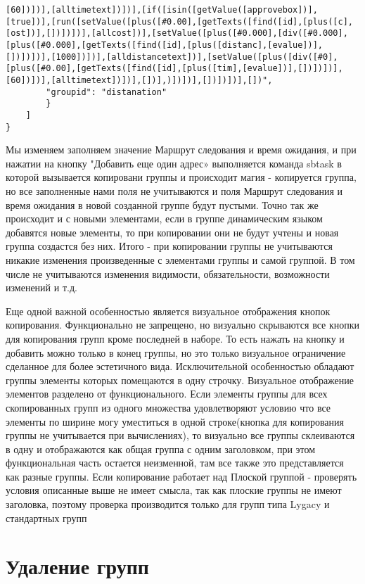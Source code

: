 \documentclass[../index.tex]{subfiles}
\begin{document}
\begin{verbatim}
[60])])],[alltimetext])])],[if([isin([getValue([approvebox])],[true])],[run([setValue([plus([#0.00],[getTexts([find([id],[plus([c],[ost])],[])])])],[allcost])],[setValue([plus([#0.000],[div([#0.000],[plus([#0.000],[getTexts([find([id],[plus([distanc],[evalue])],[])])])],[1000])])],[alldistancetext])],[setValue([plus([div([#0],[plus([#0.00],[getTexts([find([id],[plus([tim],[evalue])],[])])])], [60])])],[alltimetext])])],[])],)])])],[])])])],[])",
        "groupid": "distanation"
        }
    ]
}
\end{verbatim}
Мы изменяем заполняем значение Маршрут следования и время ожидания, и при нажатии на кнопку "Добавить еще один адрес» выполняется команда sbtask в которой вызывается копировани группы и происходит магия - копируется группа, но все заполненные нами поля не учитываются и поля Маршрут следования и время ожидания в новой созданной группе будут пустыми. Точно так же происходит и с новыми элементами, если в группе динамическим языком добавятся новые элементы, то при копировании они не будут учтены и новая группа создастся без них. 
Итого -  при копировании группы не учитываются никакие изменения произведенные с элементами группы и самой группой. В том числе не учитываются изменения видимости, обязательности, возможности изменений и т.д. 

Еще одной важной особенностью является визуальное отображения кнопок копирования. Функционально не запрещено, но визуально скрываются все кнопки для копирования групп кроме последней в наборе. То есть нажать на кнопку и добавить можно только в конец группы, но это только визуальное ограничение сделанное для более эстетичного вида. 
Исключительной особенностью обладают группы элементы которых помещаются в одну строчку. Визуальное отображение элементов разделено от функционального. Если элементы группы для всех скопированных групп из одного множества удовлетворяют условию что все элементы по ширине могу уместиться в одной строке(кнопка для копирования группы не учитывается при вычислениях), то визуально все группы склеиваются в одну и отображаются как общая группа с одним заголовком, при этом функциональная часть остается неизменной, там все также это представляется как разные группы.
Если копирование работает над Плоской группой - проверять условия описанные выше не имеет смысла, так как плоские группы не имеют заголовка, поэтому проверка производится только для групп типа Lygacy и стандартных групп
\section{Удаление групп}
\end{document}
